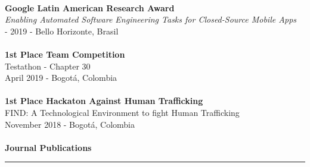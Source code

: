 \documentclass[letterpaper,11pt,oneside]{article}
\begin{document}
\\
\noindent \indent \textbf{Google Latin American Research Award} \\
\indent \textit{Enabling Automated Software Engineering Tasks for Closed-Source Mobile Apps}\\
 - 2019 - Bello Horizonte, Brasil \\
\\
\noindent \indent \textbf{1st Place Team Competition} \\
\indent Testathon - Chapter 30\\
\indent April 2019 - Bogotá, Colombia \\
\\
\noindent \indent \textbf{1st Place Hackaton Against Human Trafficking} \\
\indent FIND: A Technological Environment to fight Human Trafficking\\
\indent November 2018 - Bogotá, Colombia \\
\\ \newpage
\noindent \Large{\textbf{Journal Publications}} \\
\vspace{-2ex}
\hrule 
\normalsize
\vspace{0.5cm}
\end{document}
